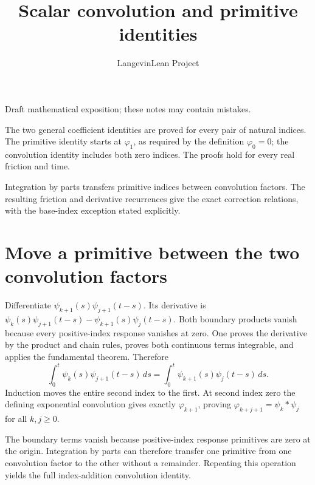 \documentclass[11pt,a4paper]{article}
\title{\texorpdfstring{Scalar convolution and primitive identities}{Scalar convolution and primitive identities}}
\author{LangevinLean Project}
\date{}
\begin{document}
\maketitle
Draft mathematical exposition; these notes may contain mistakes.


The two general coefficient identities are proved for every pair of natural indices. The primitive identity starts at \(\varphi _{1}\), as required by the definition \(\varphi _{0}=0\); the convolution identity includes both zero indices. The proofs hold for every real friction and time.



Integration by parts transfers primitive indices between convolution factors. The resulting friction and derivative recurrences give the exact correction relations, with the base-index exception stated explicitly.


\section{\texorpdfstring{Move a primitive between the two convolution factors}{Move a primitive between the two convolution factors}}


Differentiate \(\psi_{k+1}(s)\psi_{j+1}(t-s)\). Its derivative is \(\psi_k(s)\psi_{j+1}(t-s)-\psi_{k+1}(s)\psi_j(t-s)\). Both boundary products vanish because every positive-index response vanishes at zero. One proves the derivative by the product and chain rules, proves both continuous terms integrable, and applies the fundamental theorem. Therefore \[\int_0^t\psi_k(s)\psi_{j+1}(t-s)\,ds=\int_0^t\psi_{k+1}(s)\psi_j(t-s)\,ds.\] Induction moves the entire second index to the first. At second index zero the defining exponential convolution gives exactly \(\varphi_{k+1}\), proving \(\varphi_{k+j+1}=\psi_k*\psi_j\) for all \(k,j\ge0\).



The boundary terms vanish because positive-index response primitives are zero at the origin. Integration by parts can therefore transfer one primitive from one convolution factor to the other without a remainder. Repeating this operation yields the full index-addition convolution identity.
\end{document}
